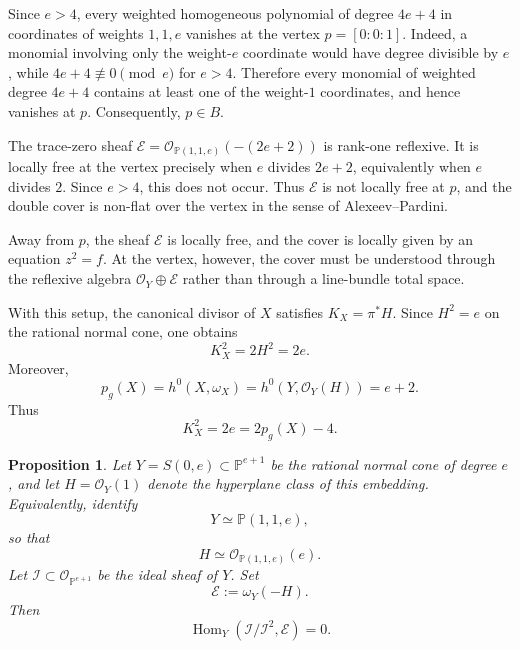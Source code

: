 \documentclass[11pt,twoside]{amsart}
\theoremstyle{plain}
\numberwithin{equation}{section}
\newtheorem{proposition}[theorem]{Proposition}
\theoremstyle{definition}
\begin{document}
Since $e>4$, every weighted homogeneous polynomial of degree $4e+4$ in coordinates of weights $1,1,e$ vanishes at the vertex $p=[0:0:1]$. Indeed, a monomial involving only the weight-$e$ coordinate would have degree divisible by $e$, while $4e+4\not\equiv 0\pmod e$ for $e>4$. Therefore every monomial of weighted degree $4e+4$ contains at least one of the weight-$1$ coordinates, and hence vanishes at $p$. Consequently, $p\in B$.

The trace-zero sheaf $\mathcal{E}=\mathcal{O}_{\mathbb{P}(1,1,e)}(-(2e+2))$ is rank-one reflexive. It is locally free at the vertex precisely when $e$ divides $2e+2$, equivalently when $e$ divides $2$. Since $e>4$, this does not occur. Thus $\mathcal{E}$ is not locally free at $p$, and the double cover is non-flat over the vertex in the sense of Alexeev--Pardini.

Away from $p$, the sheaf $\mathcal{E}$ is locally free, and the cover is locally given by an equation $z^2=f$. At the vertex, however, the cover must be understood through the reflexive algebra $\mathcal{O}_{Y}\oplus\mathcal{E}$ rather than through a line-bundle total space.

With this setup, the canonical divisor of $X$ satisfies $K_{X}=\pi^*H$. Since $H^2=e$ on the rational normal cone, one obtains
$$
K_{X}^2=2H^2=2e.
$$
Moreover,
$$
p_g(X)=h^0(X,\omega_{X})=h^0(Y,\mathcal{O}_{Y}(H))=e+2.
$$
Thus
$$
K_{X}^2=2e=2p_g(X)-4.
$$



\begin{proposition}\label{prop:hom-conormal-trace-zero-cone}
Let $Y=S(0,e)\subset\mathbb{P}^{e+1}$ be the rational normal cone of degree $e$, and let $H=\mathcal{O}_Y(1)$ denote the hyperplane class of this embedding. Equivalently, identify
$$
Y\simeq \mathbb{P}(1,1,e),
$$
so that
$$
H\simeq \mathcal{O}_{\mathbb{P}(1,1,e)}(e).
$$
Let $\mathcal{I}\subset\mathcal{O}_{\mathbb{P}^{e+1}}$ be the ideal sheaf of $Y$. Set
$$
\mathcal{E}:=\omega_Y(-H).
$$
Then
$$
\operatorname{Hom}_Y(\mathcal{I}/\mathcal{I}^2,\mathcal{E})=0.
$$
\end{proposition}
\end{document}
